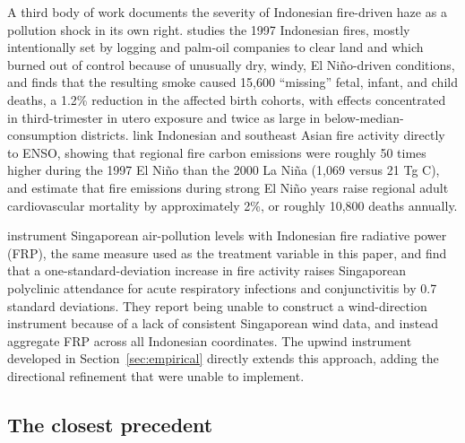 \documentclass[12pt]{article}
\begin{document}
A third body of work documents the severity of Indonesian fire-driven haze as a pollution shock in its own right. \citet{jayachandran2009} studies the 1997 Indonesian fires, mostly intentionally set by logging and palm-oil companies to clear land and which burned out of control because of unusually dry, windy, El Ni\~{n}o-driven conditions, and finds that the resulting smoke caused 15,600 ``missing'' fetal, infant, and child deaths, a 1.2\% reduction in the affected birth cohorts, with effects concentrated in third-trimester in utero exposure and twice as large in below-median-consumption districts. \citet{marlier2013} link Indonesian and southeast Asian fire activity directly to ENSO, showing that regional fire carbon emissions were roughly 50 times higher during the 1997 El Ni\~{n}o than the 2000 La Ni\~{n}a (1,069 versus 21 Tg C), and estimate that fire emissions during strong El Ni\~{n}o years raise regional adult cardiovascular mortality by approximately 2\%, or roughly 10,800 deaths annually.

\citet{sheldonsankaran2017} instrument Singaporean air-pollution levels with Indonesian fire radiative power (FRP), the same measure used as the treatment variable in this paper, and find that a one-standard-deviation increase in fire activity raises Singaporean polyclinic attendance for acute respiratory infections and conjunctivitis by 0.7 standard deviations. They report being unable to construct a wind-direction instrument because of a lack of consistent Singaporean wind data, and instead aggregate FRP across all Indonesian coordinates. The upwind instrument developed in Section~\ref{sec:empirical} directly extends this approach, adding the directional refinement that \citet{sheldonsankaran2017} were unable to implement.

\subsection{The closest precedent}
\end{document}
